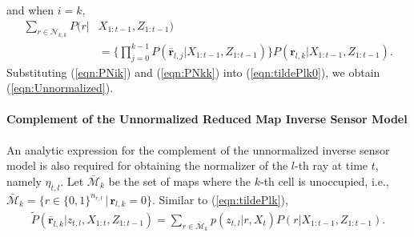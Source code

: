 \documentclass[smallextended]{svjour3}       %
\newcommand{\refeqn}[1]{(\ref{eqn:#1})}
\begin{document}
and when $i=k$, 
\begin{align}
\sum_{r\in\mathcal{N}_{k,k}} P(r|&X_{1:t-1},Z_{1:t-1})\nonumber\\&= \bigg\{\prod_{j=0}^{k-1}P(\bar{\mathbf{r}}_{l,j}|X_{1:t-1},Z_{1:t-1})\bigg\}%
P({\mathbf{r}}_{l,k}|X_{1:t-1},Z_{1:t-1}).\label{eqn:PNkk}
\end{align}
Substituting \refeqn{PNik} and \refeqn{PNkk} into \refeqn{tildePlk0}, we obtain \refeqn{Unnormalized}.



\paragraph{Complement of the Unnormalized Reduced Map Inverse Sensor Model}
An analytic expression for the complement of the unnormalized inverse sensor model is also required  for obtaining the normalizer of the $l$-th ray at time $t$, namely $\eta_{t,l}$. Let $\bar{\mathcal{M}}_k$ be the set of maps where the $k$-th cell is unoccupied, i.e., $\bar{\mathcal{M}}_k = \{ r\in\{0,1\}^{n_{r,l}}\,|\, \mathbf{r}_{l,k}=0\}$. Similar to \refeqn{tildePlk},
\begin{align}
\tilde P(\bar{\mathbf{r}}_{l,k}|z_{t,l},X_{1:t},Z_{1:t-1})= \sum_{r\in\bar{\mathcal{M}}_{k}} p(z_{t,l}|r,X_t) P(r|X_{1:t-1},Z_{1:t-1}).\label{eqn:tildePbarlk}
\end{align}
\end{document}
